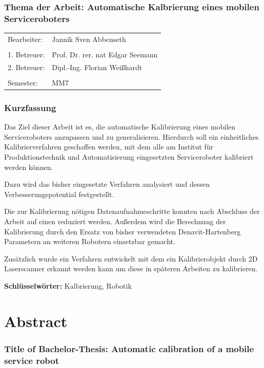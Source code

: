 \subsubsection*{Thema der Arbeit: Automatische Kalbrierung eines mobilen Serviceroboters}


\begin{tabular}{ll}

  Bearbeiter:&Jannik Sven Abbenseth\\\\
  1. Betreuer:&Prof. Dr. rer. nat Edgar Seemann\\
  2. Betreuer:&Dipl.-Ing. Florian Weißhardt \\\\
  Semester:& MM7
\end{tabular}
\subsubsection{Kurzfassung}
\label{ssub:Kurzfassung}
Das Ziel dieser Arbeit ist es, die automatische Kalibrierung eines mobilen 
Serviceroboters anzupassen und zu generalisieren.
Hierdurch soll ein einheitliches Kalibrierverfahren 
geschaffen werden, mit dem alle am Institut für Produktionstechnik und Automatisierung
eingesetzten Serviceroboter kalibriert werden können.

Dazu wird das bisher eingesetzte Verfahren analysiert und dessen 
Verbesserungspotential festgestellt.

Die zur Kalibrierung nötigen Datenaufnahmeschritte konnten nach Abschluss der 
Arbeit auf einen reduziert werden. Außerdem wird die Berechnung der 
Kalibrierung durch den Ersatz von bisher verwendeten Denavit-Hartenberg Parametern
an weiteren Robotern einsetzbar gemacht.

Zusätzlich wurde ein Verfahren entwickelt mit dem ein Kalibrierobjekt durch 2D
Laserscanner erkannt werden kann um diese in späteren Arbeiten zu kalibrieren.

\vfill
\textbf{Schlüsselwörter: }Kalbrierung, Robotik 


\section*{Abstract\phantom{g}}
\subsubsection*{Title of Bachelor-Thesis: Automatic calibration of a mobile 
  service robot\phantom{g}}


